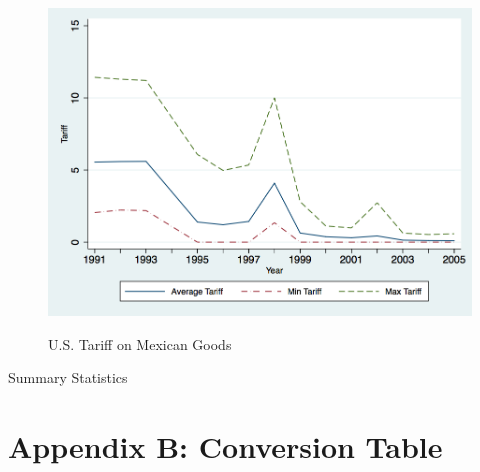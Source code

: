 \documentclass[a4paper,12pt]{article}
\begin{document}
\begin{figure}[htpb]\centering
\caption{\small U.S. Tariff on Mexican Goods}\vspace{0.2cm}
\includegraphics[scale=0.35]{usa_mex_tariff}
\label{fig:usa_mex}
\end{figure}


\begin{center}
\begin{table}

\caption{Summary Statistics}
\label{tab:sumstats}
\end{table}
\end{center}


\section{Appendix B: Conversion Table}
\end{document}
